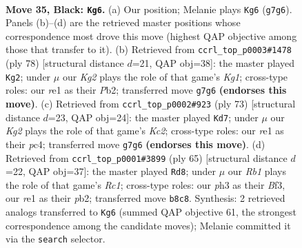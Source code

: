 \documentclass[11pt]{article}
\begin{document}
\clearpage

\begin{figure}[p]\centering
\begin{subfigure}{0.46\textwidth}\centering
\resizebox{\linewidth}{!}{%
\newchessgame
\chessboard[
  setfen={1r6/1p3pk1/p3p3/8/P3P3/5P1P/1R5P/4R1K1 b - - 0 35},
  showmover=false,
  pgfstyle=straightmove, color=movearrow, markmove={g7-g6}
]}
\caption{}
\end{subfigure}\hfill
\begin{subfigure}{0.46\textwidth}\centering
\resizebox{\linewidth}{!}{%
\newchessgame
\chessboard[
  setfen={6k1/1p2r1p1/2p5/4pp2/2P4P/6P1/1P3P2/4R1K1 w - - 0 40},
  showmover=false,
  pgfstyle=straightmove, color=movearrow, markmove={g1-g2}
]}
\caption{}
\end{subfigure}
\\[4pt]
\begin{subfigure}{0.46\textwidth}\centering
\resizebox{\linewidth}{!}{%
\newchessgame
\chessboard[
  setfen={r7/2k1pp2/6p1/2K4p/p1P4P/4P3/R4PP1/8 b - - 1 37},
  showmover=false,
  pgfstyle=straightmove, color=movearrow, markmove={c7-d7}
]}
\caption{}
\end{subfigure}\hfill
\begin{subfigure}{0.46\textwidth}\centering
\resizebox{\linewidth}{!}{%
\newchessgame
\chessboard[
  setfen={2r5/2p3pp/5k2/p6P/P7/1P3b2/NPR2P2/6K1 b - - 1 33},
  showmover=false,
  pgfstyle=straightmove, color=movearrow, markmove={c8-d8}
]}
\caption{}
\end{subfigure}
\caption{\textbf{Move 35, Black: \texttt{Kg6}.} (a) Our position; Melanie plays \texttt{Kg6} (\texttt{g7g6}). Panels (b)--(d) are the retrieved master positions whose correspondence most drove this move (highest QAP objective among those that transfer to it). (b) Retrieved from \texttt{ccrl\_top\_p0003\#1478} (ply 78) [structural distance $d$=21, QAP obj=38]: the master played \texttt{Kg2}; under $\mu$ our \emph{Kg2} plays the role of that game's \emph{Kg1}; cross-type roles: our \emph{r}e1 as their \emph{P}b2; transferred move \texttt{g7g6} \textbf{(endorses this move)}. (c) Retrieved from \texttt{ccrl\_top\_p0002\#923} (ply 73) [structural distance $d$=23, QAP obj=24]: the master played \texttt{Kd7}; under $\mu$ our \emph{Kg2} plays the role of that game's \emph{Kc2}; cross-type roles: our \emph{r}e1 as their \emph{p}c4; transferred move \texttt{g7g6} \textbf{(endorses this move)}. (d) Retrieved from \texttt{ccrl\_top\_p0001\#3899} (ply 65) [structural distance $d$=22, QAP obj=37]: the master played \texttt{Rd8}; under $\mu$ our \emph{Rb1} plays the role of that game's \emph{Rc1}; cross-type roles: our \emph{p}h3 as their \emph{B}f3, our \emph{r}e1 as their \emph{p}b2; transferred move \texttt{b8c8}. Synthesis: 2 retrieved analogs transferred to \texttt{Kg6} (summed QAP objective 61, the strongest correspondence among the candidate moves); Melanie committed it via the \texttt{search} selector.}
\label{fig:thought-m69}
\end{figure}
\end{document}
